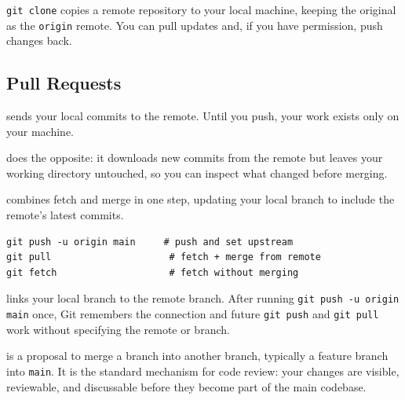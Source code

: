 \texttt{git clone} copies a remote repository to your local machine, keeping the original as the \texttt{origin} remote.
You can pull updates and, if you have permission, push changes back.








\subsection{Pull Requests}

 sends your local commits to the remote.
Until you push, your work exists only on your machine.

 does the opposite: it downloads new commits from the remote
but leaves your working directory untouched, so you can inspect what changed before merging.

 combines fetch and merge in one step,
updating your local branch to include the remote's latest commits.

\begin{verbatim}
git push -u origin main     # push and set upstream
git pull                     # fetch + merge from remote
git fetch                    # fetch without merging
\end{verbatim}

 links your local branch to the remote branch.
After running \texttt{git push -u origin main} once, Git remembers the connection
and future \texttt{git push} and \texttt{git pull} work without specifying
the remote or branch.

 is a proposal to merge a branch into another branch, typically a
feature branch into \texttt{main}. It is the standard mechanism for code review: your changes are visible,
reviewable, and discussable before they become part of the main codebase.


